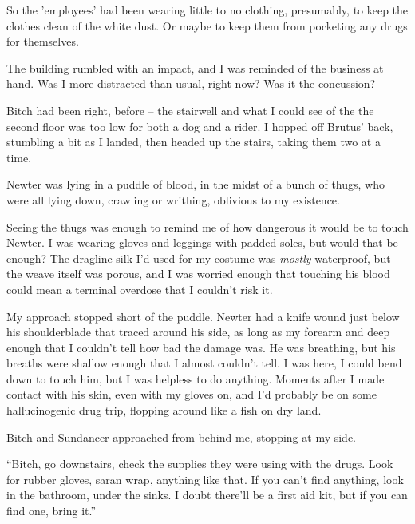 So the 'employees' had been wearing little to no clothing, presumably, to keep the clothes clean of the white dust.  Or maybe to keep them from pocketing any drugs for themselves.



The building rumbled with an impact, and I was reminded of the business at hand.  Was I more distracted than usual, right now?  Was it the concussion?



Bitch had been right, before – the stairwell and what I could see of the the second floor was too low for both a dog and a rider.  I hopped off Brutus' back, stumbling a bit as I landed, then headed up the stairs, taking them two at a time.



Newter was lying in a puddle of blood, in the midst of a bunch of thugs, who were all lying down, crawling or writhing, oblivious to my existence.



Seeing the thugs was enough to remind me of how dangerous it would be to touch Newter.  I was wearing gloves and leggings with padded soles, but would that be enough?  The dragline silk I'd used for my costume was \emph{mostly} waterproof, but the weave itself was porous, and I was worried enough that touching his blood could mean a terminal overdose that I couldn't risk it.



My approach stopped short of the puddle.  Newter had a knife wound just below his shoulderblade that traced around his side, as long as my forearm and deep enough that I couldn't tell how bad the damage was.  He was breathing, but his breaths were shallow enough that I almost couldn't tell.  I was here, I could bend down to touch him, but I was helpless to do anything.  Moments after I made contact with his skin, even with my gloves on, and I'd probably be on some hallucinogenic drug trip, flopping around like a fish on dry land.



Bitch and Sundancer approached from behind me, stopping at my side.



``Bitch, go downstairs, check the supplies they were using with the drugs.  Look for rubber gloves, saran wrap, anything like that.  If you can't find anything, look in the bathroom, under the sinks.  I doubt there'll be a first aid kit, but if you can find one, bring it.''



